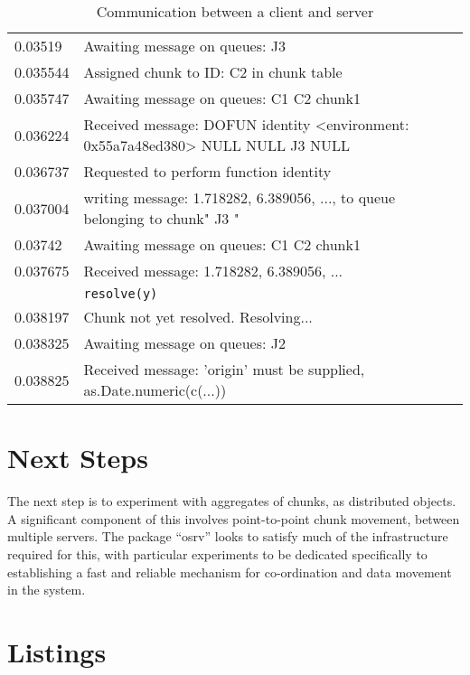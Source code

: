 \documentclass[a4paper,10pt]{article}
\begin{document}
\begin{table}
\begin{tabularx}{\textwidth}{lX}
		0.03519  & \textcolor{\clientcolour}{Awaiting message on queues: J3} \\
		0.035544 & \textcolor{\servercolour}{Assigned chunk to ID: C2 in chunk table} \\
		0.035747 & \textcolor{\servercolour}{Awaiting message on queues: C1     C2     chunk1} \\
		0.036224 & \textcolor{\servercolour}{Received message: DOFUN identity <environment: 0x55a7a48ed380> NULL NULL J3 NULL} \\
		0.036737 & \textcolor{\servercolour}{Requested to perform function identity} \\
		0.037004 & \textcolor{\servercolour}{writing message: 1.718282, 6.389056, ..., to queue belonging to chunk" J3 "} \\
		0.03742  & \textcolor{\servercolour}{Awaiting message on queues: C1     C2     chunk1} \\
		0.037675 & \textcolor{\clientcolour}{Received message: 1.718282, 6.389056, ... } \\
			 & \textcolor{\clientcolour}{\texttt{resolve(y)}} \\
		0.038197 & \textcolor{\clientcolour}{Chunk not yet resolved. Resolving...} \\
		0.038325 & \textcolor{\clientcolour}{Awaiting message on queues: J2} \\
		0.038825 & \textcolor{\clientcolour}{Received message: 'origin' must be supplied, as.Date.numeric(c(...))} \\
		\bottomrule
	\end{tabularx}
	\caption{Communication between a client and server}
	\label{tab:chunk-comm}
\end{table}

\section{Next Steps}

The next step is to experiment with aggregates of chunks, as distributed objects.
A significant component of this involves point-to-point chunk movement, between multiple servers.
The package ``osrv'' looks to satisfy much of the infrastructure required for
this, with particular experiments to be dedicated specifically to establishing
a fast and reliable mechanism for co-ordination and data movement in the system.

\section{Listings}\label{sec:listings}
\end{document}
